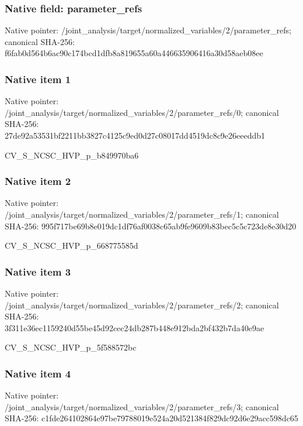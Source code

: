 \documentclass[10pt,a4paper]{article}
\begin{document}
\subsubsection{Native field: parameter\_\allowbreak{}refs}
Native pointer: /joint\_\allowbreak{}analysis/target/normalized\_\allowbreak{}variables/2/parameter\_\allowbreak{}refs; canonical SHA-256: f6fab0d564b6ac90c174bcd1dfb8a819655a60a446635906416a30d58aeb08ee

\subsubsection{Native item 1}
Native pointer: /joint\_\allowbreak{}analysis/target/normalized\_\allowbreak{}variables/2/parameter\_\allowbreak{}refs/0; canonical SHA-256: 27de92a53531bf2211bb3827c4125c9ed0d27c08017dd4519dc8c9e26eeeddb1

\begingroup\raggedright\sloppy CV\_\allowbreak{}S\_\allowbreak{}NCSC\_\allowbreak{}HVP\_\allowbreak{}p\_\allowbreak{}b849970ba6\par\endgroup

\subsubsection{Native item 2}
Native pointer: /joint\_\allowbreak{}analysis/target/normalized\_\allowbreak{}variables/2/parameter\_\allowbreak{}refs/1; canonical SHA-256: 995f717be69b8e019dc1df76af0038c65ab9fe9609b83bec5c5c723de8e30d20

\begingroup\raggedright\sloppy CV\_\allowbreak{}S\_\allowbreak{}NCSC\_\allowbreak{}HVP\_\allowbreak{}p\_\allowbreak{}668775585d\par\endgroup

\subsubsection{Native item 3}
Native pointer: /joint\_\allowbreak{}analysis/target/normalized\_\allowbreak{}variables/2/parameter\_\allowbreak{}refs/2; canonical SHA-256: 3f311e36ec1159240d55be45d92cec24db287b448e912bda2bf432b7da40e9ae

\begingroup\raggedright\sloppy CV\_\allowbreak{}S\_\allowbreak{}NCSC\_\allowbreak{}HVP\_\allowbreak{}p\_\allowbreak{}5f588572bc\par\endgroup

\subsubsection{Native item 4}
Native pointer: /joint\_\allowbreak{}analysis/target/normalized\_\allowbreak{}variables/2/parameter\_\allowbreak{}refs/3; canonical SHA-256: c1fde264102864e97be79788019e524a20d521384f829dc92d6e29acc598dc65
\end{document}
